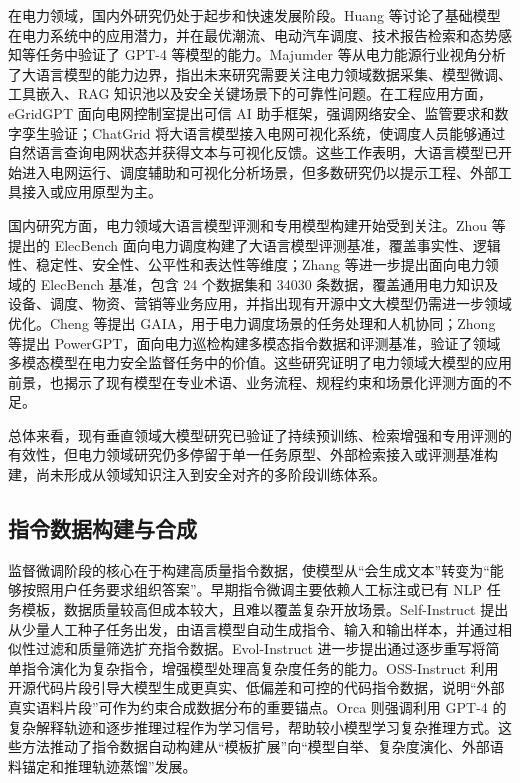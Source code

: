 \documentclass[fontset=fandol,type=master,campus=shenzhen,etitleauto=true]{hithesisbook}
\begin{document}
在电力领域，国内外研究仍处于起步和快速发展阶段。Huang 等讨论了基础模型在电力系统中的应用潜力，并在最优潮流、电动汽车调度、技术报告检索和态势感知等任务中验证了 GPT-4 等模型的能力\cite{ref17}。Majumder 等从电力能源行业视角分析了大语言模型的能力边界，指出未来研究需要关注电力领域数据采集、模型微调、工具嵌入、RAG 知识池以及安全关键场景下的可靠性问题\cite{ref4}。在工程应用方面，eGridGPT 面向电网控制室提出可信 AI 助手框架，强调网络安全、监管要求和数字孪生验证\cite{ref18}；ChatGrid 将大语言模型接入电网可视化系统，使调度人员能够通过自然语言查询电网状态并获得文本与可视化反馈\cite{ref19}。这些工作表明，大语言模型已开始进入电网运行、调度辅助和可视化分析场景，但多数研究仍以提示工程、外部工具接入或应用原型为主。

国内研究方面，电力领域大语言模型评测和专用模型构建开始受到关注。Zhou 等提出的 ElecBench 面向电力调度构建了大语言模型评测基准，覆盖事实性、逻辑性、稳定性、安全性、公平性和表达性等维度\cite{ref20}；Zhang 等进一步提出面向电力领域的 ElecBench 基准，包含 24 个数据集和 34030 条数据，覆盖通用电力知识及设备、调度、物资、营销等业务应用，并指出现有开源中文大模型仍需进一步领域优化\cite{ref21}。Cheng 等提出 GAIA，用于电力调度场景的任务处理和人机协同\cite{ref22}；Zhong 等提出 PowerGPT，面向电力巡检构建多模态指令数据和评测基准，验证了领域多模态模型在电力安全监督任务中的价值\cite{ref23}。这些研究证明了电力领域大模型的应用前景，也揭示了现有模型在专业术语、业务流程、规程约束和场景化评测方面的不足。

总体来看，现有垂直领域大模型研究已验证了持续预训练、检索增强和专用评测的有效性，但电力领域研究仍多停留于单一任务原型、外部检索接入或评测基准构建，尚未形成从领域知识注入到安全对齐的多阶段训练体系。

\subsection{指令数据构建与合成}

监督微调阶段的核心在于构建高质量指令数据，使模型从“会生成文本”转变为“能够按照用户任务要求组织答案”。早期指令微调主要依赖人工标注或已有 NLP 任务模板，数据质量较高但成本较大，且难以覆盖复杂开放场景。Self-Instruct 提出从少量人工种子任务出发，由语言模型自动生成指令、输入和输出样本，并通过相似性过滤和质量筛选扩充指令数据\cite{ref24}。Evol-Instruct 进一步提出通过逐步重写将简单指令演化为复杂指令，增强模型处理高复杂度任务的能力\cite{ref25}。OSS-Instruct 利用开源代码片段引导大模型生成更真实、低偏差和可控的代码指令数据，说明“外部真实语料片段”可作为约束合成数据分布的重要锚点\cite{ref26}。Orca 则强调利用 GPT-4 的复杂解释轨迹和逐步推理过程作为学习信号，帮助较小模型学习复杂推理方式\cite{ref27}。这些方法推动了指令数据自动构建从“模板扩展”向“模型自举、复杂度演化、外部语料锚定和推理轨迹蒸馏”发展。
\end{document}

